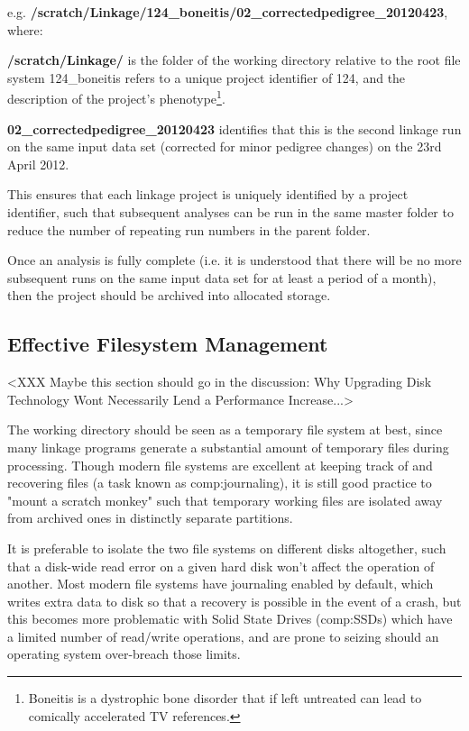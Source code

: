 e.g. {\bf\footnotesize /scratch/Linkage/124\_boneitis/02\_correctedpedigree\_20120423},  where:
\begin{description}
\item{{\bf\footnotesize /scratch/Linkage/} is the folder of the working directory relative to the root file system
124\_boneitis refers to a unique project identifier of 124, and the description of the project's phenotype\footnote{Boneitis is a dystrophic bone disorder that if left untreated can lead to comically accelerated TV references.}.}
\item{{\bf\footnotesize 02\_correctedpedigree\_20120423} identifies that this is the second linkage run on the same input data set (corrected for minor pedigree changes) on the 23rd April 2012.}
\end{description}

This ensures that each linkage project is uniquely identified by a project identifier, such that subsequent analyses can be run in the same master folder to reduce the number of repeating run numbers in the parent folder.

Once an analysis is fully complete (i.e. it is understood that there will be no more subsequent runs on the same input data set for at least a period of a month), then the project should be archived into allocated storage.

\subsection{Effective Filesystem Management}

<XXX Maybe this section should go in the discussion: Why Upgrading Disk Technology Wont Necessarily Lend a Performance Increase...>

The working directory should be seen as a temporary file system at best, since many linkage programs generate a substantial amount of temporary files during processing. Though modern file systems are excellent at keeping track of and recovering files (a task known as \gls{comp:journaling}), it is still good practice to "mount a scratch monkey" such that temporary working files are isolated away from archived ones in distinctly separate partitions. 

It is preferable to isolate the two file systems on different disks altogether, such that a disk-wide read error on a given hard disk won't affect the operation of another. Most modern file systems have journaling enabled by default, which writes extra data to disk so that a recovery is possible in the event of a crash, but this becomes more problematic with Solid State Drives (\gls{comp:SSD}s) which have a limited number of read/write operations, and are prone to seizing should an operating system over-breach those limits.

